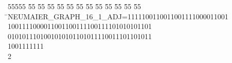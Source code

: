 %
%
\begin{tabbing}
55555 \= 55 \= 55 \= 55 \= 55 \= 55 \= 55 \= 55 \= 55 \= 55 \= 55 \= 55 \= 55 \= \>NEUMAIER\_GRAPH\_16\_1\_ADJ=1111100110011001111000011001\\[0pt]
1001111000011001100111100111101010101101\\[0pt]
\>0101011101001010101101011110011101101011\\[0pt]
1001111111\\[0pt]
2\>\end{tabbing}
